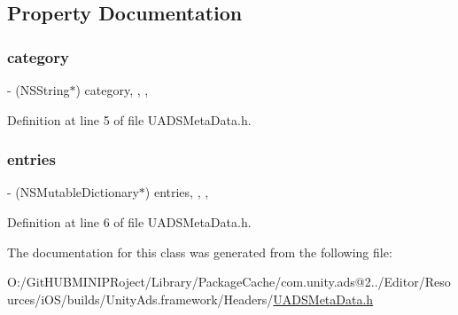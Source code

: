 \subsection{Property Documentation}
\mbox{\label{interface_u_a_d_s_meta_data_a53cb347f7356256b054a9e817234857c}} 
\subsubsection{\texorpdfstring{category}{category}}
{\footnotesize\ttfamily -\/ (N\+S\+String$\ast$) category\hspace{0.3cm}{\ttfamily [read]}, {\ttfamily [write]}, {\ttfamily [nonatomic]}, {\ttfamily [strong]}}



Definition at line 5 of file U\+A\+D\+S\+Meta\+Data.\+h.

\mbox{\label{interface_u_a_d_s_meta_data_a00f2e83e0ee9d76645a17cb82b8896a0}} 
\subsubsection{\texorpdfstring{entries}{entries}}
{\footnotesize\ttfamily -\/ (N\+S\+Mutable\+Dictionary$\ast$) entries\hspace{0.3cm}{\ttfamily [read]}, {\ttfamily [write]}, {\ttfamily [nonatomic]}, {\ttfamily [strong]}}



Definition at line 6 of file U\+A\+D\+S\+Meta\+Data.\+h.



The documentation for this class was generated from the following file\+:\begin{DoxyCompactItemize}
\item 
O\+:/\+Git\+H\+U\+B\+M\+I\+N\+I\+P\+Roject/\+Library/\+Package\+Cache/com.\+unity.\+ads@2../\+Editor/\+Resources/i\+O\+S/builds/\+Unity\+Ads.\+framework/\+Headers/\mbox{\hyperlink{_u_a_d_s_meta_data_8h}{U\+A\+D\+S\+Meta\+Data.\+h}}\end{DoxyCompactItemize}
